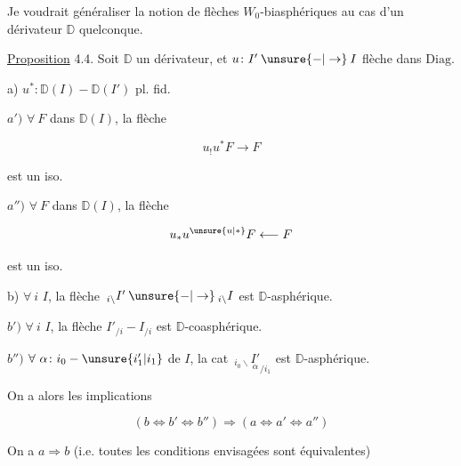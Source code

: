 Je voudrait généraliser  la notion de flèches $W_0$-biasphériques au cas d'un dérivateur $\mathbb{D}$ quelconque. 

\uline{Proposition} 4.4. Soit $\mathbb{D}$ un dérivateur, et $u\colon I'\mathbin{\unsure{-|\to}}I$  flèche dans $\mathrm{Diag}$.  

a) $u^*\colon\mathbb{D}(I)\mathbin{-}\mathbb{D}(I')$ pl. fid.

$a')$ $\forall\ F$ dans $\mathbb{D}(I)$, la flèche

\[
 u_!u^*F\longrightarrow F
\]

est un iso. 

$a'')$ $\forall\ F$ dans $\mathbb{D}(I)$, la flèche

\[
 u_*u^{\unsure{u|*}}F\longleftarrow F
\]

est un iso. 

b) $\forall\ i$  $I$, la flèche $\,{}_{i\backslash}I'\mathbin{\unsure{-|\to}}{}_{i\backslash}I$ est $\mathbb{D}$-asphérique.

$b')$ $\forall\ i$  $I$, la flèche $I'_{/i}\mathbin{-}I_{/i}$ est $\mathbb{D}$-coasphérique.

$b'')$ $\forall\ \alpha\colon i_0\mathbin{-}\unsure{i_1'|i_1}$ de $I$, la cat $\,{}_{i_0\backslash}\underset{\alpha}{I'}_{/i_1}$ est $\mathbb{D}$-asphérique.

On a alors les implications

\[
 (b\Longleftrightarrow b'\Longleftrightarrow b'')\Longrightarrow
 (a\Longleftrightarrow a'\Longleftrightarrow a'')
\]

 On a $a\Rightarrow b$ (i.e. toutes les conditions  envisagées sont équivalentes)
